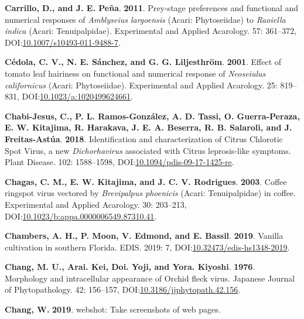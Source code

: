 \documentclass[12pt,final,CPage]{ufthesis}
\newlength{\cslhangindent}
\newenvironment{CSLReferences}[2] %
{%
	\setlength{\parindent}{0pt}
	\ifodd #1 \everypar{\setlength{\hangindent}{\cslhangindent}}\ignorespaces\fi
	\ifnum #2 > 0
	\setlength{\parskip}{#2\baselineskip}
	\fi
}%
{}
\begin{document}
{\begin{CSLReferences}{1}{0}
  \leavevmode{}%
  \textbf{Carrillo, D., and J. E. Peña}. \textbf{2011}. Prey-stage preferences and functional and numerical responses of {\emph{Amblyseius largoensis}} ({Acari: Phytoseiidae}) to {\emph{Raoiella indica}} ({Acari}: {Tenuipalpidae}). Experimental and Applied Acarology. 57: 361--372, DOI:\href{https://doi.org/10.1007/s10493-011-9488-7}{10.1007/s10493-011-9488-7}.

  \leavevmode{}%
  \textbf{Cédola, C. V., N. E. Sánchez, and G. G. Liljesthröm}. \textbf{2001}. Effect of tomato leaf hairiness on functional and numerical response of {\emph{Neoseiulus californicus}} ({Acari}: {Phytoseiidae}). Experimental and Applied Acarology. 25: 819--831, DOI:\href{https://doi.org/10.1023/a:1020499624661}{10.1023/a:1020499624661}.

  \leavevmode{}%
  \textbf{Chabi-Jesus, C., P. L. Ramos-González, A. D. Tassi, O. Guerra-Peraza, E. W. Kitajima, R. Harakava, J. E. A. Beserra, R. B. Salaroli, and J. Freitas-Astúa}. \textbf{2018}. Identification and characterization of {Citrus Chlorotic Spot Virus}, a new {\emph{Dichorhavirus}} associated with {Citrus leprosis}-like symptoms. Plant Disease. 102: 1588--1598, DOI:\href{https://doi.org/10.1094/pdis-09-17-1425-re}{10.1094/pdis-09-17-1425-re}.

  \leavevmode{}%
  \textbf{Chagas, C. M., E. W. Kitajima, and J. C. V. Rodrigues}. \textbf{2003}. {Coffee ringspot virus} vectored by {\emph{Brevipalpus phoenicis}} ({Acari}: {Tenuipalpidae}) in coffee. Experimental and Applied Acarology. 30: 203--213, DOI:\href{https://doi.org/10.1023/b:appa.0000006549.87310.41}{10.1023/b:appa.0000006549.87310.41}.

  \leavevmode{}%
  \textbf{Chambers, A. H., P. Moon, V. Edmond, and E. Bassil}. \textbf{2019}. Vanilla cultivation in southern {Florida}. {EDIS}. 2019: 7, DOI:\href{https://doi.org/10.32473/edis-hs1348-2019}{10.32473/edis-hs1348-2019}.

  \leavevmode{}%
  \textbf{Chang, M. U., Arai. Kei, Doi. Yoji, and Yora. Kiyoshi}. \textbf{1976}. Morphology and intracellular appearance of {Orchid fleck virus}. Japanese Journal of Phytopathology. 42: 156--157, DOI:\href{https://doi.org/10.3186/jjphytopath.42.156}{10.3186/jjphytopath.42.156}.

  \leavevmode{}%
  \textbf{Chang, W.} \textbf{2019}. {webshot:} Take screenshots of web pages.


\end{CSLReferences}}
\end{document}
